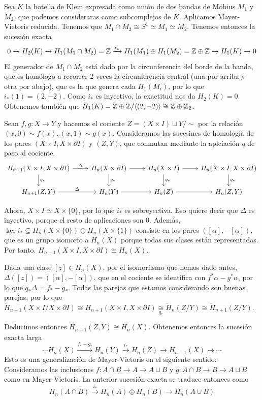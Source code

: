 \documentclass[TA.tex]{subfiles}
\begin{document}
\begin{ej}
Sea $K$ la botella de Klein expresada como unión de dos bandas de Möbius $M_1$ y $M_2$, que podemos consideraras como subcomplejos de $K$. Aplicamos Mayer-Vietoris reducida. Tenemos que $M_1\cap M_2\cong S^1\simeq M_1\simeq M_2$. Tenemos entonces la sucesión exacta
\[
0\to H_2(K)\to H_1(M_1\cap M_2)=\mathbb{Z}\xrightarrow{i_*} H_1(M_1)\oplus H_1(M_2)=\mathbb{Z}\oplus \mathbb{Z}\to H_1(K)\to 0
\]
El generador de $M_1\cap M_2$ está dado por la circunferencia del borde de la banda, que es homólogo a recorrer 2 veces la circunferencia central (una por arriba y otra por abajo), que es la que genera cada $H_1(M_i)$, por lo que $i_*(1)=(2,-2)$. Como $i_*$ es inyectivo, la exactitud nos da $H_2(K)=0$. Obtenemos también que $H_1(K)=\mathbb{Z}\oplus\mathbb{Z}/\langle{(2,-2)}\rangle\cong \mathbb{Z}\oplus \mathbb{Z}_2$. 
\end{ej}

\begin{ej}
Sean $f,g:X\to Y$ y hacemos el cociente $Z=(X\times I)\sqcup Y/\sim$ por la relación $(x,0)\sim f(x), (x,1)\sim g(x)$. Consideramos las sucesines de homología de los pares $(X\times I,X\times\partial I)$ y $(Z,Y)$, que conmutan mediante la aplciación $q$ de paso al cociente.
\[
\begin{tikzcd}
H_{n+1}(X\times I,X\times\partial I)\arrow[r,"\Delta"]\arrow[d, "q_*"] & H_n(X\times\partial I)\arrow[r]\arrow[d, "q_*"] & H_n(X\times I)\arrow[r]\arrow[d, "q_*"] & H_n(X\times I,X\times\partial I)\arrow[d, "q_*"]\\
 H_{n+1}(Z,Y)\arrow[r,"\Delta"] & H_n(Y)\arrow[r] & H_n(Z)\arrow[r] & H_n(Z,Y)
\end{tikzcd}
\]




Ahora, $X\times I\simeq X\times\{0\}$, por lo que $i_*$ es sobreyectiva. Eso quiere decir que $\Delta$ es inyectivo, porque el resto de aplicaciones son 0. Además, $\ker i_*\subseteq H_n(X\times\{0\})\oplus H_n(X\times\{1\})$ consiste en los pares $([\alpha],-[\alpha])$, que es un grupo isomorfo a $H_n(X)$ porque todas sus clases están representadas.  Por tanto. $H_{n+1}(X\times I,X\times\partial I)\cong H_n(X)$. 

Dada una clase $[z]\in H_n(X)$, por el isomorfismo que hemos dado antes, $\Delta([z])=([\alpha],-[\alpha])$, que en el cociente se identifica con $f^*\alpha-g^*\alpha$, por lo que $q_*\Delta=f_*-g_*$. Todas las parejas que estamos considerando son buenas parejas, por lo que $\widetilde{H}_{n+1}(X\times I/X\times\partial I)\cong H_{n+1}(X\times I,X\times\partial I)\underset{q_*}{\cong} \widetilde{H}_n(Z/Y)\cong \widetilde{H}_{n+1}(Z/Y)$. 

Deducimos entonces $H_{n+1}(Z,Y)\cong H_n(X)$. Obtenemos entonces la sucesión exacta larga
\[
\cdots H_n(X)\xrightarrow{f_*-g_*}H_n(Y)\xrightarrow{i_*} H_n(Z)\to H_{n-1}(X)\to\cdots
\]
Esto es una generalización de Mayer-Vietoris en el siguiente sentido: Consideramos las inclusiones $f:A\cap B\to A\to A\sqcup B$ y $g:A\cap B\to B\to A\sqcup B$ como en Mayer-Vietoris. La anterior sucesión exacta se traduce entonces como
\[
H_n(A\cap B)\xrightarrow{i_*} H_n(A)\oplus H_n(B)\to H_n(A\cup B)
\]
\end{ej}
\end{document}
